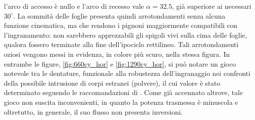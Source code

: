 l'arco di accesso \`e nullo e l'arco di recesso vale $\alpha=32.5$, 
gi\`a superiore ai necessari $30^{\circ}$. La sommit\`a delle foglie presenta quindi
arrotondamenti senza alcuna funzione cinematica, ma che rendono i pignoni
maggiormente compatibili con l'ingranamento: non sarebbero apprezzabili
gli spigoli vivi sulla cima delle foglie, qualora fossero terminate
alla fine dell'ipociclo rettilineo. Tali arrotondamenti oziosi
vengono messi in evidenza, in colore pi\`u scuro,
nella stessa figura.
In entrambe le figure, \ref{fig:660cy_hor} e \ref{fig:1290cy_hor}, si pu\`o
notare un gioco notevole tra le dentature, funzionale alla
robustezza dell'ingranaggio nei confronti della possibile
intrusione di corpi estranei (polvere), il cui valore \`e
stato determinato seguendo le raccomandazioni di \cite{bs978}.
Come gi\`a accennato altrove, tale gioco non suscita inconvenienti, in quanto
la potenza trasmessa \`e minuscola e oltretutto, in generale, il
suo flusso non presenta inversioni.
\endinput
